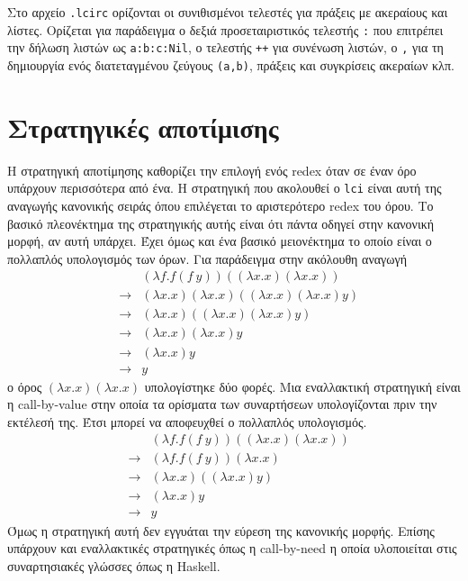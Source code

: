 \documentclass[a4paper,11pt]{article}
\newcommand{\lci}{\texttt{\en{lci}}}
\newcommand{\kwd}[1]{\en{\texttt{#1}}}
\newcommand{\en}[1]{\textlatin{#1}}
\begin{document}
Στο αρχείο \kwd{.lcirc} ορίζονται οι συνιθισμένοι τελεστές για πράξεις με ακεραίους
και λίστες. Ορίζεται για παράδειγμα ο δεξιά προσεταιριστικός τελεστής \kwd{:}
που επιτρέπει την δήλωση λιστών ως \kwd{a:b:c:Nil}, ο τελεστής \kwd{++} για συνένωση
λιστών, ο \kwd{,} για τη δημιουργία ενός διατεταγμένου ζεύγους \kwd{(a,b)}, πράξεις
και συγκρίσεις ακεραίων κλπ.

\section{Στρατηγικές αποτίμισης}
Η στρατηγική αποτίμησης καθορίζει την επιλογή ενός \en{redex} όταν σε έναν όρο
υπάρχουν περισσότερα από ένα. Η στρατηγική που ακολουθεί ο \lci{} είναι αυτή της
αναγωγής κανονικής σειράς όπου επιλέγεται το αριστερότερο \en{redex} του όρου. Το
βασικό πλεονέκτημα της στρατηγικής αυτής είναι ότι πάντα οδηγεί στην κανονική μορφή,
αν αυτή υπάρχει. Έχει όμως και ένα βασικό μειονέκτημα το οποίο είναι ο πολλαπλός
υπολογισμός των όρων. Για παράδειγμα στην ακόλουθη αναγωγή
\begin{eqnarray*}
	&& (\lambda f.f(f\ y))((\lambda x.x)(\lambda x.x)) \\
	& \rightarrow & (\lambda x.x)(\lambda x.x)((\lambda x.x)(\lambda x.x)y) \\
	& \rightarrow & (\lambda x.x)((\lambda x.x)(\lambda x.x)y) \\
	& \rightarrow & (\lambda x.x)(\lambda x.x)y \\
	& \rightarrow & (\lambda x.x)y \\
	& \rightarrow & y
\end{eqnarray*}
ο όρος $(\lambda x.x)(\lambda x.x)$ υπολογίστηκε δύο φορές. Μια εναλλακτική στρατηγική
είναι η \en{call-by-value} στην οποία τα ορίσματα των συναρτήσεων υπολογίζονται πριν
την εκτέλεσή της. Έτσι μπορεί να αποφευχθεί ο πολλαπλός υπολογισμός.
\begin{eqnarray*}
	&& (\lambda f.f(f\ y))((\lambda x.x)(\lambda x.x)) \\
	& \rightarrow & (\lambda f.f(f\ y))(\lambda x.x) \\
	& \rightarrow & (\lambda x.x)((\lambda x.x)y) \\
	& \rightarrow & (\lambda x.x)y \\
	& \rightarrow & y
\end{eqnarray*}
Όμως η στρατηγική αυτή δεν εγγυάται την εύρεση της κανονικής μορφής. Επίσης υπάρχουν
και εναλλακτικές στρατηγικές όπως η \en{call-by-need} η οποία υλοποιείται στις
συναρτησιακές γλώσσες όπως η \en{Haskell}.
\end{document}
